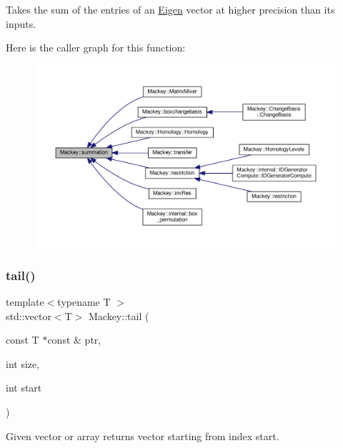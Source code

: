 Takes the sum of the entries of an \hyperlink{namespaceEigen}{Eigen} vector at higher precision than its inputs. 

Here is the caller graph for this function\+:\nopagebreak
\begin{figure}[H]
\begin{center}
\leavevmode
\includegraphics[width=350pt]{namespaceMackey_a359aa27a035d2b1f1a3f2f8270fc9e52_icgraph}
\end{center}
\end{figure}
\mbox{\label{namespaceMackey_a1e4b11e9d2a5b70f8380af87cae31ef3}} 
\subsubsection{\texorpdfstring{tail()}{tail()}\hspace{0.1cm}{\footnotesize\ttfamily [1/2]}}
{\footnotesize\ttfamily template$<$typename T $>$ \\
std\+::vector$<$T$>$ Mackey\+::tail (\begin{DoxyParamCaption}\item[{const T $\ast$const \&}]{ptr,  }\item[{int}]{size,  }\item[{int}]{start }\end{DoxyParamCaption})\hspace{0.3cm}{\ttfamily [inline]}}



Given vector or array returns vector starting from index start. 

